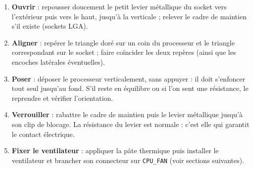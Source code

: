 \documentclass[11pt]{article}
\begin{document}
\begin{methode}
\begin{enumerate}
  \item \textbf{Ouvrir} : repousser doucement le petit levier métallique du socket vers l'extérieur puis vers le haut, jusqu'à la verticale ; relever le cadre de maintien s'il existe (sockets LGA).
  \item \textbf{Aligner} : repérer le triangle doré sur un coin du processeur et le triangle correspondant sur le socket ; faire coïncider les deux repères (ainsi que les encoches latérales éventuelles).
  \item \textbf{Poser} : déposer le processeur verticalement, sans appuyer : il doit s'enfoncer tout seul jusqu'au fond. S'il reste en équilibre ou si l'on sent une résistance, le reprendre et vérifier l'orientation.
  \item \textbf{Verrouiller} : rabattre le cadre de maintien puis le levier métallique jusqu'à son clip de blocage. La résistance du levier est normale : c'est elle qui garantit le contact électrique.
  \item \textbf{Fixer le ventilateur} : appliquer la pâte thermique puis installer le ventilateur et brancher son connecteur sur \texttt{CPU\_FAN} (voir sections suivantes).
\end{enumerate}
\end{methode}
\end{document}
